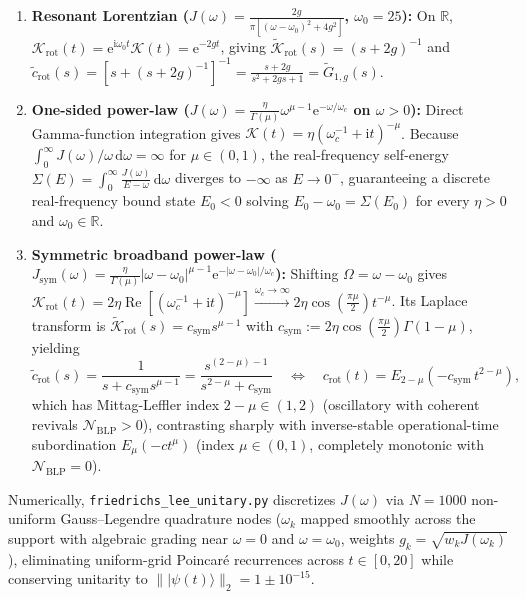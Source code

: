 \documentclass[onecolumn,10pt,notitlepage,amsmath,amssymb,floatfix]{revtex4-2}
\theoremstyle{plain}
\theoremstyle{definition}
\newcommand{\dd}{\mathrm{d}}
\newcommand{\ii}{\mathrm{i}}
\newcommand{\ee}{\mathrm{e}}
\newcommand{\NBLP}{\mathcal{N}_{\mathrm{BLP}}}
\begin{document}
\begin{enumerate}[label=(\roman*),leftmargin=1.8em,itemsep=2pt]
\item \textbf{Resonant Lorentzian ($J(\omega) = \frac{2g}{\pi[(\omega-\omega_0)^2 + 4g^2]}$, $\omega_0 = 25$):} On $\mathbb{R}$, $\mathcal{K}_{\mathrm{rot}}(t) = \ee^{\ii\omega_0 t}\mathcal{K}(t) = \ee^{-2gt}$, giving $\tilde{\mathcal{K}}_{\mathrm{rot}}(s) = (s+2g)^{-1}$ and $\tilde{c}_{\mathrm{rot}}(s) = [s + (s+2g)^{-1}]^{-1} = \frac{s+2g}{s^2+2gs+1} = \tilde{G}_{1,g}(s)$.
\item \textbf{One-sided power-law ($J(\omega) = \frac{\eta}{\Gamma(\mu)}\omega^{\mu-1}\ee^{-\omega/\omega_c}$ on $\omega > 0$):} Direct Gamma-function integration gives $\mathcal{K}(t) = \eta(\omega_c^{-1} + \ii t)^{-\mu}$. Because $\int_0^\infty J(\omega)/\omega\,\dd\omega = \infty$ for $\mu \in (0,1)$, the real-frequency self-energy $\Sigma(E) = \int_0^\infty \frac{J(\omega)}{E-\omega}\,\dd\omega$ diverges to $-\infty$ as $E \to 0^-$, guaranteeing a discrete real-frequency bound state $E_0 < 0$ solving $E_0 - \omega_0 = \Sigma(E_0)$ for every $\eta > 0$ and $\omega_0 \in \mathbb{R}$.
\item \textbf{Symmetric broadband power-law ($J_{\mathrm{sym}}(\omega) = \frac{\eta}{\Gamma(\mu)}|\omega-\omega_0|^{\mu-1}\ee^{-|\omega-\omega_0|/\omega_c}$):} Shifting $\Omega = \omega - \omega_0$ gives $\mathcal{K}_{\mathrm{rot}}(t) = 2\eta\operatorname{Re}[(\omega_c^{-1} + \ii t)^{-\mu}] \xrightarrow{\omega_c\to\infty} 2\eta\cos(\frac{\pi\mu}{2}) t^{-\mu}$. Its Laplace transform is $\tilde{\mathcal{K}}_{\mathrm{rot}}(s) = c_{\mathrm{sym}} s^{\mu-1}$ with $c_{\mathrm{sym}} := 2\eta\cos(\frac{\pi\mu}{2})\Gamma(1-\mu)$, yielding
\begin{equation}
\label{eq:S6_E2minusmu}
\tilde{c}_{\mathrm{rot}}(s) = \frac{1}{s + c_{\mathrm{sym}} s^{\mu-1}} = \frac{s^{(2-\mu)-1}}{s^{2-\mu} + c_{\mathrm{sym}}}
\quad\Longleftrightarrow\quad
c_{\mathrm{rot}}(t) = E_{2-\mu}\!\left(-c_{\mathrm{sym}}\,t^{2-\mu}\right),
\end{equation}
which has Mittag-Leffler index $2-\mu \in (1,2)$ (oscillatory with coherent revivals $\NBLP > 0$), contrasting sharply with inverse-stable operational-time subordination $E_\mu(-c t^\mu)$ (index $\mu \in (0,1)$, completely monotonic with $\NBLP = 0$).
\end{enumerate}
Numerically, \texttt{friedrichs\_lee\_unitary.py} discretizes $J(\omega)$ via $N = 1000$ non-uniform Gauss--Legendre quadrature nodes ($\omega_k$ mapped smoothly across the support with algebraic grading near $\omega = 0$ and $\omega = \omega_0$, weights $g_k = \sqrt{w_k J(\omega_k)}$), eliminating uniform-grid Poincar\'e recurrences across $t \in [0,20]$ while conserving unitarity to $\| |\psi(t)\rangle \|_2 = 1 \pm 10^{-15}$.
\end{document}
